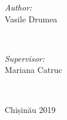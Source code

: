 \begin{titlepage}
\begin{center}
      \begin{minipage}{0.4\textwidth}
      \begin{flushleft} \large
      \emph{Author:}\\
      Vasile Drumea
      \end{flushleft}
      \end{minipage}
      ~
      \begin{minipage}{0.4\textwidth}
      \begin{flushright} \large
      \emph{Supervisor:} \\
      Mariana Catruc %
      \end{flushright}
      \end{minipage}\\[4cm]

      \vspace{5 mm}





      
      \Large
      Chișinău 2019

      \vfill %
      \end{center}
      
\end{titlepage}


